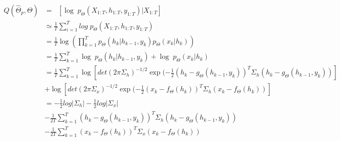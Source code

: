 \documentclass[11pt,a4paper]{report}
\begin{document}
\begin{align*}
    Q(\hat \Theta_p, \Theta) & = \mathop{\mathbb{E}_{\hat \Theta_p}} \left[ \log \; p_{\Theta}(X_{1:T}, h_{1:T}, y_{1:T}) | X_{1:T} \right]                                                          \\
                             & \simeq \frac{1}{T} \sum_{i=1}^T  log \; p_{\Theta}(X_{1:T}, h_{1:T}, y_{1:T})                                                                                         \\
                             & = \frac{1}{T} \log\left(\prod_{k=1}^{T} p_{\Theta}(h_k | h_{k-1}, y_k) p_{\Theta}(x_k | h_k)\right)                                                                   \\
                             & = \frac{1}{T} \sum_{k=1}^{T} \log \; p_{\Theta}(h_k | h_{k-1}, y_k) + \log \; p_{\Theta}(x_k | h_k)                                                                   \\
                             & = \frac{1}{T} \sum_{k=1}^{T} \log \left[det(2\pi\Sigma_h)^{-1/2} \exp(-\frac{1}{2}(h_k - g_\Theta(h_{k-1}, y_{k}))^T \Sigma_h (h_k - g_\Theta(h_{k-1}, y_{k}))\right] \\
                             & + \log \left[det(2\pi\Sigma_x)^{-1/2} \exp(-\frac{1}{2}(x_k - f_\Theta(h_k))^T \Sigma_h (x_k - f_\Theta(h_k))\right]                                                  \\
                             & = -\frac{1}{2} log |\Sigma_h| -\frac{1}{2} log |\Sigma_x|                                                                                                             \\
                             & - \frac{1}{2T} \sum_{k=1}^{T}(h_k - g_\Theta(h_{k-1}, y_{k}))^T \Sigma_h (h_k - g_\Theta(h_{k-1}, y_{k}))                                                             \\
                             & - \frac{1}{2T} \sum_{k=1}^{T}(x_k - f_\Theta(h_k))^T \Sigma_x (x_k - f_\Theta(h_k))                                                                                   \\
\end{align*}
\end{document}
